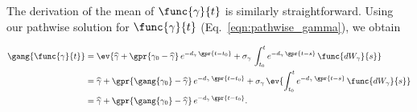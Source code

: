 The derivation of the mean of $\func{\gamma}{t}$ is similarly straightforward. Using our pathwise solution for $\func{\gamma}{t}$ (Eq.~\ref{eqn:pathwise_gamma}), we obtain

\begin{align}
    \gang{\func{\gamma}{t}} &= \ev{\widehat{\gamma} + \gpr{\gamma_0 - \widehat{\gamma}}\,e^{-d_{\gamma}\,\gpr{t - t_0}} + \sigma_{\gamma}\,\int_{t_{0}}^{t} e^{-d_{\gamma}\,\gpr{t - s}}\,\func{d{W}_{\gamma}}{s}} \nonumber \\
    	&= \widehat{\gamma} + \gpr{\gang{\gamma_0} - \widehat{\gamma}}\,e^{-d_{\gamma}\,\gpr{t - t_0}} + \sigma_{\gamma}\,\ev{\int_{t_{0}}^{t} e^{-d_{\gamma}\,\gpr{t - s}}\,\func{d{W}_{\gamma}}{s}} \nonumber \\
    	&= \widehat{\gamma} + \gpr{\gang{\gamma_0} - \widehat{\gamma}}\,e^{-d_{\gamma}\,\gpr{t - t_0}}. \label{eqn:mean_gamma}
\end{align}